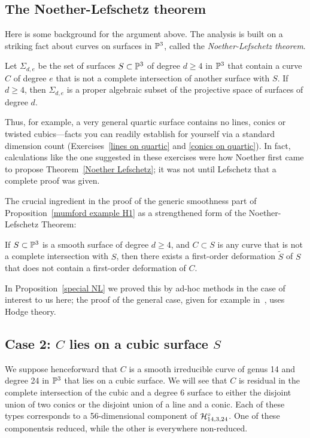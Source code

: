 \subsection{The Noether-Lefschetz theorem}

Here is some background for the  argument above. The analysis is built on a striking fact about curves on surfaces in $\PP^3$, called the \emph{Noether-Lefschetz theorem}.


\begin{theorem}\label{Noether Lefschetz}
Let $\Sigma_{d,e}$ be the set of surfaces 
$S \subset \PP^3$ of degree $d \geq 4$ in $\PP^3$ that contain a curve $C$ of degree $e$ that is not a complete intersection
of another surface with $S$. If $d\geq 4$, then $\Sigma_{d,e}$ is a proper algebraic subset of the projective space of surfaces of
degree $d$.
\end{theorem}

Thus, for example, a very general quartic surface contains no lines, conics or twisted cubics---facts you can readily establish for yourself via a standard dimension count (Exercises~\ref{lines on quartic} and \ref{conics on quartic}).
In fact, calculations like the one suggested in these exercises were how Noether first came to propose Theorem~\ref{Noether Lefschetz}; it was not until Lefschetz that a complete proof was given.

The crucial ingredient in the proof of the generic smoothness part of Proposition~\ref{mumford example H1} as a strengthened form of the Noether-Lefschetz Theorem:

\begin{theorem}
If $S \subset \PP^3$ is a smooth surface of degree $d \geq 4$, and $C \subset S$ is any curve that is not a complete intersection with $S$, then there exists a first-order deformation $\widetilde S$ of $S$ that does not contain a first-order deformation of $C$.
\end{theorem}

In Proposition~\ref{special NL} we proved this by ad-hoc methods in the case of interest to us here; the proof of the general case, given for example in~\cite[Theorem 6.1]{Huizenga}, uses Hodge theory.

\subsection{Case 2: $C$ lies on a cubic surface $S$}

We suppose henceforward that $C$ is a smooth irreducible curve of genus 14 and degree 24 in $\PP^3$ that lies on a cubic surface. We will see that $C$ is residual in the complete
intersection of the cubic and a degree 6 surface to either the disjoint union of two conics or the disjoint union of a line and a conic. Each of these
types corresponds to a 56-dimensional component of $\cH^\circ_{14,3,24}$. One of these componentsis reduced, while the other is everywhere
non-reduced.

